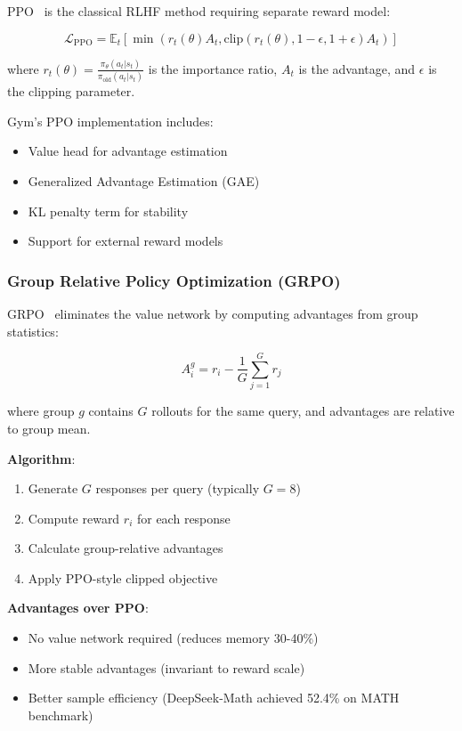 PPO~\citep{schulman2017ppo} is the classical RLHF method requiring separate reward model:

\begin{equation}
\mathcal{L}_{\text{PPO}} = \mathbb{E}_t \left[ \min(r_t(\theta) A_t, \text{clip}(r_t(\theta), 1-\epsilon, 1+\epsilon) A_t) \right]
\end{equation}

where $r_t(\theta) = \frac{\pi_\theta(a_t|s_t)}{\pi_{\text{old}}(a_t|s_t)}$ is the importance ratio, $A_t$ is the advantage, and $\epsilon$ is the clipping parameter.

Gym's PPO implementation includes:
\begin{itemize}
\item Value head for advantage estimation
\item Generalized Advantage Estimation (GAE)
\item KL penalty term for stability
\item Support for external reward models
\end{itemize}

\subsubsection{Group Relative Policy Optimization (GRPO)}

GRPO~\citep{shao2024deepseekmath} eliminates the value network by computing advantages from group statistics:

\begin{equation}
A_i^g = r_i - \frac{1}{G} \sum_{j=1}^G r_j
\end{equation}

where group $g$ contains $G$ rollouts for the same query, and advantages are relative to group mean.

\textbf{Algorithm}:
\begin{enumerate}
\item Generate $G$ responses per query (typically $G=8$)
\item Compute reward $r_i$ for each response
\item Calculate group-relative advantages
\item Apply PPO-style clipped objective
\end{enumerate}

\textbf{Advantages over PPO}:
\begin{itemize}
\item No value network required (reduces memory 30-40\%)
\item More stable advantages (invariant to reward scale)
\item Better sample efficiency (DeepSeek-Math achieved 52.4\% on MATH benchmark)
\end{itemize}

